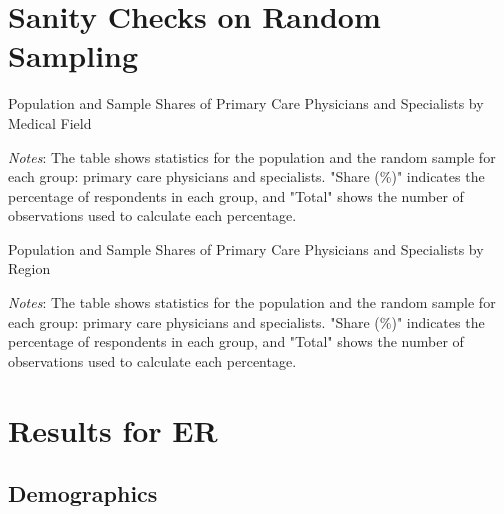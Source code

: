 \documentclass[11pt]{article}
\theoremstyle{definition}
\begin{document}
\section{Sanity Checks on Random Sampling}\label{sanity}

\begin{table}[H]
    \centering
    \caption{Population and Sample Shares of Primary Care Physicians and Specialists by Medical Field}
              \begin{adjustbox}{width=0.85\linewidth}  

\end{adjustbox}
     \parbox{.9\linewidth}{
        	\vspace{.2cm}
        		\scriptsize{\scriptsize{{\emph{Notes}: The table shows statistics for the population and the random sample for each group: primary care physicians and specialists. "Share (\%)" indicates the percentage of respondents in each group, and "Total" shows the number of observations used to calculate each percentage.}}}}
    \label{tab:sanity_spec}
\end{table}

\begin{table}[H]
    \centering
    \caption{Population and Sample Shares of Primary Care Physicians and Specialists by Region}
              \begin{adjustbox}{width=0.65\linewidth}  

\end{adjustbox}
     \parbox{.9\linewidth}{
        	\vspace{.2cm}
        		\scriptsize{\scriptsize{{\emph{Notes}: The table shows statistics for the population and the random sample for each group: primary care physicians and specialists. "Share (\%)" indicates the percentage of respondents in each group, and "Total" shows the number of observations used to calculate each percentage.}}}}
    \label{tab:sanity_geo}
\end{table}

%


\section{Results for ER}

\subsection{Demographics}
\end{document}
